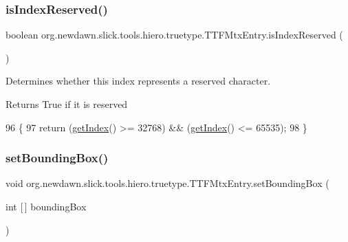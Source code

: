 \subsubsection{\texorpdfstring{is\+Index\+Reserved()}{isIndexReserved()}}
{\footnotesize\ttfamily boolean org.\+newdawn.\+slick.\+tools.\+hiero.\+truetype.\+T\+T\+F\+Mtx\+Entry.\+is\+Index\+Reserved (\begin{DoxyParamCaption}{ }\end{DoxyParamCaption})\hspace{0.3cm}{\ttfamily [inline]}}

Determines whether this index represents a reserved character. \begin{DoxyReturn}{Returns}
True if it is reserved 
\end{DoxyReturn}

\begin{DoxyCode}
96                                      \{
97         \textcolor{keywordflow}{return} (\mbox{\hyperlink{classorg_1_1newdawn_1_1slick_1_1tools_1_1hiero_1_1truetype_1_1_t_t_f_mtx_entry_a81326d1275e3ec5e754e4d8f51a59284}{getIndex}}() >= 32768) && (\mbox{\hyperlink{classorg_1_1newdawn_1_1slick_1_1tools_1_1hiero_1_1truetype_1_1_t_t_f_mtx_entry_a81326d1275e3ec5e754e4d8f51a59284}{getIndex}}() <= 65535);
98     \}
\end{DoxyCode}
\mbox{\label{classorg_1_1newdawn_1_1slick_1_1tools_1_1hiero_1_1truetype_1_1_t_t_f_mtx_entry_a1e76e1cf4209d95f2cee2ded1904147a}} 
\subsubsection{\texorpdfstring{set\+Bounding\+Box()}{setBoundingBox()}}
{\footnotesize\ttfamily void org.\+newdawn.\+slick.\+tools.\+hiero.\+truetype.\+T\+T\+F\+Mtx\+Entry.\+set\+Bounding\+Box (\begin{DoxyParamCaption}\item[{int \mbox{[}$\,$\mbox{]}}]{bounding\+Box }\end{DoxyParamCaption})\hspace{0.3cm}{\ttfamily [inline]}}

